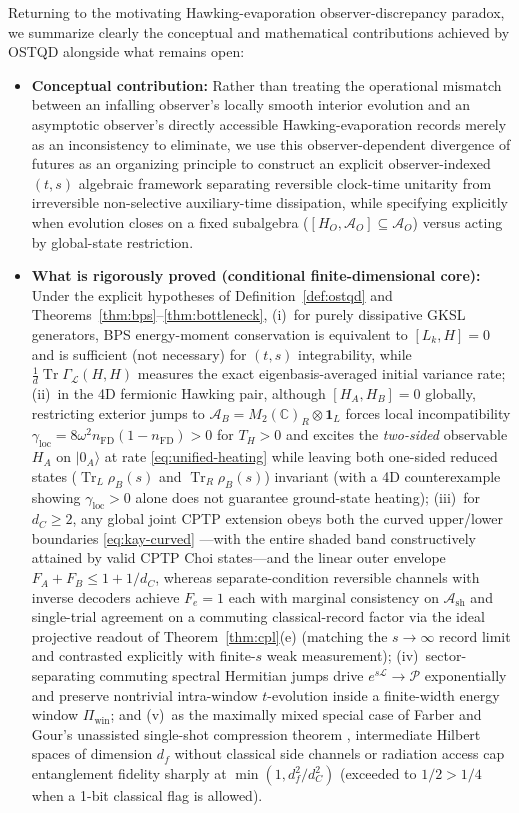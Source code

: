 \documentclass[11pt,a4paper]{article}
\theoremstyle{definition}
\theoremstyle{remark}
\newcommand{\Tr}{\operatorname{Tr}}
\newcommand{\cA}{\mathcal{A}}
\newcommand{\cL}{\mathcal{L}}
\newcommand{\cP}{\mathcal{P}}
\newcommand{\bbC}{\mathbb{C}}
\newcommand{\1}{\mathbf{1}}
\begin{document}
Returning to the motivating Hawking-evaporation observer-discrepancy paradox, we summarize clearly the conceptual and mathematical contributions achieved by OSTQD alongside what remains open:
\begin{itemize}
  \item \textbf{Conceptual contribution:} Rather than treating the operational mismatch between an infalling observer's locally smooth interior evolution and an asymptotic observer's directly accessible Hawking-evaporation records merely as an inconsistency to eliminate, we use this observer-dependent divergence of futures as an organizing principle to construct an explicit observer-indexed $(t,s)$ algebraic framework separating reversible clock-time unitarity from irreversible non-selective auxiliary-time dissipation, while specifying explicitly when evolution closes on a fixed subalgebra ($[H_O,\cA_O]\subseteq\cA_O$) versus acting by global-state restriction.
  \item \textbf{What is rigorously proved (conditional finite-dimensional core):} Under the explicit hypotheses of Definition~\ref{def:ostqd} and Theorems~\ref{thm:bps}--\ref{thm:bottleneck}, (i)~for purely dissipative GKSL generators, BPS energy-moment conservation is equivalent to $[L_k,H]=0$ and is sufficient (not necessary) for $(t,s)$ integrability, while $\frac{1}{d}\Tr\Gamma_{\cL}(H,H)$ measures the exact eigenbasis-averaged initial variance rate; (ii)~in the 4D fermionic Hawking pair, although $[H_A,H_B]=0$ globally, restricting exterior jumps to $\cA_B = M_2(\bbC)_R\otimes\1_L$ forces local incompatibility $\gamma_{\mathrm{loc}} = 8\omega^2 n_{\mathrm{FD}}(1-n_{\mathrm{FD}}) > 0$ for $T_H>0$ and excites the \emph{two-sided} observable $H_A$ on $|0_A\rangle$ at rate \eqref{eq:unified-heating} while leaving both one-sided reduced states ($\Tr_L\rho_B(s)$ and $\Tr_R\rho_B(s)$) invariant (with a 4D counterexample showing $\gamma_{\mathrm{loc}}>0$ alone does not guarantee ground-state heating); (iii)~for $d_C\ge 2$, any global joint CPTP extension obeys both the curved upper/lower boundaries \eqref{eq:kay-curved} \cite{Kay2009,Nechita2021}---with the entire shaded band constructively attained by valid CPTP Choi states---and the linear outer envelope $F_A+F_B \le 1+1/d_C$, whereas separate-condition reversible channels with inverse decoders achieve $F_e=1$ each with marginal consistency on $\cA_{\mathrm{sh}}$ and single-trial agreement on a commuting classical-record factor via the ideal projective readout of Theorem~\ref{thm:cpl}(e) (matching the $s\to\infty$ record limit and contrasted explicitly with finite-$s$ weak measurement); (iv)~sector-separating commuting spectral Hermitian jumps drive $e^{s\cL} \to \cP$ exponentially and preserve nontrivial intra-window $t$-evolution inside a finite-width energy window $\Pi_{\mathrm{win}}$; and (v)~as the maximally mixed special case of Farber and Gour's unassisted single-shot compression theorem \cite{FarberGour2026}, intermediate Hilbert spaces of dimension $d_f$ without classical side channels or radiation access cap entanglement fidelity sharply at $\min(1, d_f^2/d_C^2)$ (exceeded to $1/2>1/4$ when a 1-bit classical flag is allowed).

\end{itemize}
\end{document}
